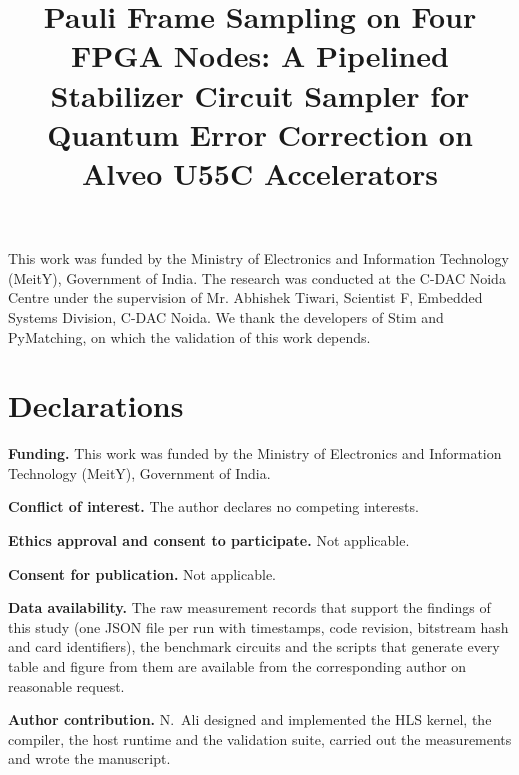 \documentclass[pdflatex,sn-mathphys-num]{sn-jnl}
\theoremstyle{thmstyleone}
\begin{document}
\title[Pauli Frame Sampling on Four FPGA Nodes]{Pauli Frame Sampling on Four FPGA Nodes: A Pipelined Stabilizer
Circuit Sampler for Quantum Error Correction on Alveo U55C Accelerators}

\author*[1]{ }


\abstract{}


\maketitle











\backmatter

This work was funded by the Ministry of Electronics and Information Technology (MeitY), Government of India. The
research was conducted at the C-DAC Noida Centre under the supervision of Mr. Abhishek Tiwari, Scientist F, Embedded
Systems Division, C-DAC Noida. We thank the developers of Stim and PyMatching, on which the validation of this work
depends.

\section*{Declarations}

\textbf{Funding.} This work was funded by the Ministry of Electronics and Information Technology (MeitY), Government of
India.

\textbf{Conflict of interest.} The author declares no competing interests.

\textbf{Ethics approval and consent to participate.} Not applicable.

\textbf{Consent for publication.} Not applicable.

\textbf{Data availability.} The raw measurement records that support the findings of this study (one JSON file per
run with timestamps, code revision, bitstream hash and card identifiers), the benchmark circuits and the scripts that
generate every table and figure from them are available from the corresponding author on reasonable request.

\textbf{Author contribution.} N.~Ali designed and implemented the HLS kernel, the compiler, the host runtime and the
validation suite, carried out the measurements and wrote the manuscript.


\end{document}
